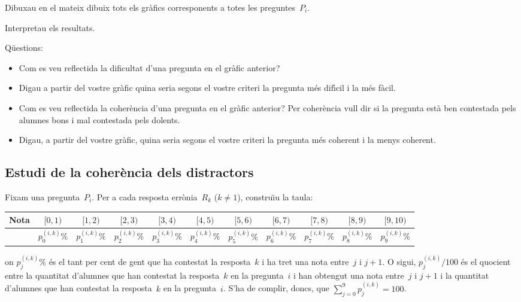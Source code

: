 Dibuxau en el mateix dibuix tots els gr\`afics corresponents a totes
les preguntes~$P_i$.

Interpretau els resultats.

Q\"uestions:

\begin{itemize}
\item Com es veu reflectida la dificultat d'una pregunta en el gr\`afic 
anterior?

\item Digau a partir del vostre gr\`afic quina seria segons el vostre
criteri la pregunta m\'es dif\'{\i}cil i la m\'es f\`acil.

\item Com es veu reflectida la coher\`encia
 d'una pregunta en el gr\`afic 
anterior? Per coher\`encia 
vull dir si la pregunta est\`a ben contestada pels alumnes bons i 
mal contestada pels dolents.

\item Digau, a partir del vostre gr\`afic, quina seria segons el vostre
criteri la pregunta m\'es coherent i la menys 
coherent.

\end{itemize}

\subsection{Estudi de la coher\`encia 
dels distractors}

Fixam una pregunta~$P_i$. Per a cada resposta err\`onia~$R_k$ ($k\not =1$),
constru\"{\i}u la taula:
\begin{center}
\begin{tabular}{|c||c@{}c@{}c@{}c@{}c@{}c@{}c@{}c@{}c@{}c@{}|}
\hline
Nota&$[0,1)$&$[1,2)$&$[2,3)$&$[3,4)$&$[4,5)$&$[5,6)$&$[6,7)$&$[7,8)$&$[8,9)$&$[9,10)$\\\hline\hline
&$p_0^{(i,k)}\%$& $p_1^{(i,k)}\%$&$p_2^{(i,k)}\%$&$p_3^{(i,k)}\%$&
$p_4^{(i,k)}\%$&$p_5^{(i,k)}\%$&$p_6^{(i,k)}\%$&$p_7^{(i,k)}\%$&
$p_8^{(i,k)}\%$&$p_9^{(i,k)}\%$\\\hline
\end{tabular}
\end{center}
on $p_j^{(i,k)}\%$ \'es el tant per cent de gent que ha contestat la 
resposta~$k$ i ha tret una nota entre~$j$ i \mbox{$j+1$.} O sigui, 
$p_j^{(i,k)}/100$ \'es el quocient entre la quantitat d'alumnes que han
contestat la resposta~$k$ en la pregunta~$i$ i han obtengut una nota
entre~$j$ i $j+1$ i la quantitat d'alumnes que han contestat la
resposta~$k$ en la pregunta~$i$. S'ha de complir, doncs, que
$\sum\limits_{j=0}^9 p_j^{(i,k)}=100$.

